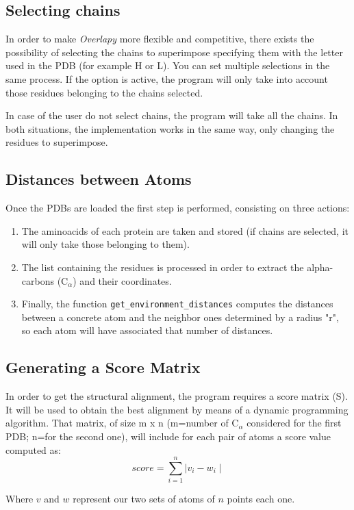 \documentclass{article}
\begin{document}
\subsection*{\color{gray}Selecting chains}
In order to make \textit{Overlapy} more flexible and competitive, there exists the possibility of selecting the chains to superimpose specifying them with the letter used in the PDB (for example H or L). You can set multiple selections in the same process. If the option is active, the program will only take into account those residues belonging to the chains selected.

In case of the user do not select chains, the program will take all the chains. In both situations, the implementation works in the same way, only changing the residues to superimpose.

\subsection*{\color{gray}Distances between Atoms}
Once the PDBs are loaded the first step is performed, consisting on three actions:
\begin{enumerate}
	\item The aminoacids of each protein are taken and stored (if chains are selected, it will only take those belonging to them).
	\item The list containing the residues is processed in order to extract the alpha-carbons (C$_\alpha$) and their coordinates.
	\item Finally, the function \texttt{get\_environment\_distances} computes the distances between a concrete atom and the neighbor ones determined by a radius "r", so each atom will have associated that number of distances.
\end{enumerate}

\subsection*{\color{gray}Generating a Score Matrix}
In order to get the structural alignment, the program requires a score matrix (S). It will be used to obtain the best alignment by means of a dynamic programming algorithm. That matrix, of size m x n (m=number of C$_\alpha$ considered for the first PDB; n=for the second one), will include for each pair of atoms a score value computed as:\\
$$score=\sum\limits_{i=1}^n{\mid v_i - w_i\mid}$$

Where $v$ and $w$ represent our two sets of atoms of $n$ points each one.\\
\end{document}

